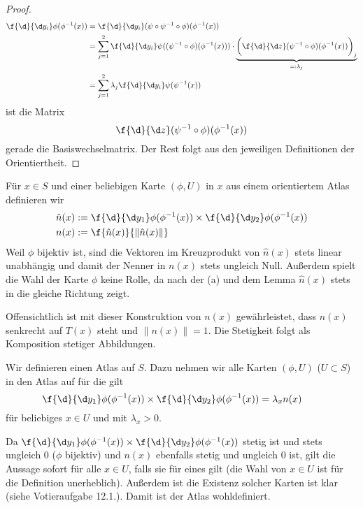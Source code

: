 \documentclass{mywork}
\begin{document}
\begin{aufgabe}
\begin{enumerate}[(a)]
\begin{lem*}
\begin{proof}
\begin{align*}
						\f{\d}{\d y_i} \phi(\phi^{-1}(x))
						&= \f{\d}{\d y_i} (\psi \circ \psi^{-1} \circ \phi)(\phi^{-1}(x)) \\
						&= \sum_{j=1}^2 \f {\d}{\d y_i} \psi((\psi^{-1}\circ \phi)(\phi^{-1}(x))) \cdot \underbrace{\bigg( \f{\d}{\d z} (\psi^{-1} \circ \phi)(\phi^{-1}(x))\bigg)_j}_{=:\lambda_j} \\
						&= \sum_{j=1}^2 \lambda_j \f{\d}{\d y_i}\psi(\psi^{-1}(x))
					\end{align*}
					ist die Matrix
					\[
						\f{\d}{\d z} (\psi^{-1}\circ \phi)(\phi^{-1}(x))
					\]
					gerade die Basiswechselmatrix.
					Der Rest folgt aus den jeweiligen Definitionen der Orientiertheit.
				\end{proof}
			\end{lem*}
			\begin{seg}[„$\implies$“]
				Für $x\in S$ und einer beliebigen Karte $(\phi, U)$ in $x$ aus einem orientiertem Atlas definieren wir
				\begin{align*}
					\hat n(x) &:= \f{\d}{\d y_1}\phi(\phi^{-1}(x)) \times \f{\d}{\d y_2} \phi(\phi^{-1}(x)) \\
					n(x) &:= \f{\hat n(x)}{\|\hat n(x)\|}
				\end{align*}
				Weil $\phi$ bijektiv ist, sind die Vektoren im Kreuzprodukt von $\hat n(x)$ stets linear unabhängig und damit der Nenner in $n(x)$ stets ungleich Null.
				Außerdem spielt die Wahl der Karte $\phi$ keine Rolle, da nach der (a) und dem Lemma $\hat n(x)$ stets in die gleiche Richtung zeigt.

				Offensichtlich ist mit dieser Konstruktion von $n(x)$ gewährleistet, dass $n(x)$ senkrecht auf $T(x)$ steht und $\|n(x)\|=1$.
				Die Stetigkeit folgt als Komposition stetiger Abbildungen.
			\end{seg}
			\begin{seg}[„$\Longleftarrow$“]
				Wir definieren einen Atlas auf $S$.
				Dazu nehmen wir alle Karten $(\phi, U)$ ($U\subset S$) in den Atlas auf für die gilt
				\[
					\f{\d}{\d y_1}\phi(\phi^{-1}(x)) \times \f{\d}{\d y_2} \phi(\phi^{-1}(x))
					= \lambda_x n(x) \qquad 
				\]
				für beliebiges $x \in U$ und mit $\lambda_x > 0$.
				
				Da $\f{\d}{\d y_1}\phi(\phi^{-1}(x)) \times \f{\d}{\d y_2} \phi(\phi^{-1}(x))$ stetig ist und stets ungleich $0$ ($\phi$ bijektiv) und $n(x)$ ebenfalls stetig und ungleich $0$ ist, gilt die Aussage sofort für alle $x\in U$, falls sie für eines gilt (die Wahl von $x\in U$ ist für die Definition unerheblich).
				Außerdem ist die Existenz solcher Karten ist klar (siehe Votieraufgabe 12.1.).
				Damit ist der Atlas wohldefiniert.


\end{seg}
\end{enumerate}
\end{aufgabe}
\end{document}
